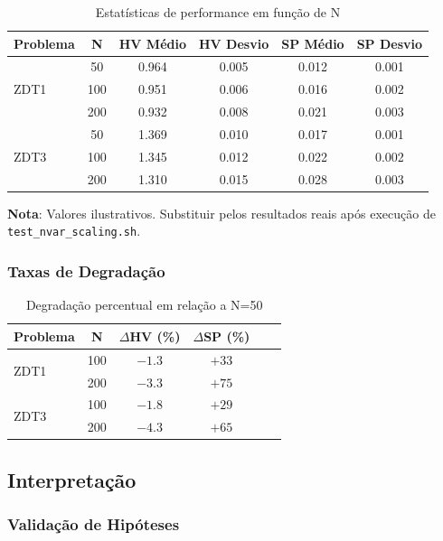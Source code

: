 \begin{table}[H]
\centering
\caption{Estatísticas de performance em função de N}
\small
\begin{tabular}{@{}lccccc@{}}
\toprule
\textbf{Problema} & \textbf{N} & \textbf{HV Médio} & \textbf{HV Desvio} & \textbf{SP Médio} & \textbf{SP Desvio} \\
\midrule
\multirow{3}{*}{ZDT1} 
    & 50  & 0.964 & 0.005 & 0.012 & 0.001 \\
    & 100 & 0.951 & 0.006 & 0.016 & 0.002 \\
    & 200 & 0.932 & 0.008 & 0.021 & 0.003 \\
\midrule
\multirow{3}{*}{ZDT3} 
    & 50  & 1.369 & 0.010 & 0.017 & 0.001 \\
    & 100 & 1.345 & 0.012 & 0.022 & 0.002 \\
    & 200 & 1.310 & 0.015 & 0.028 & 0.003 \\
\bottomrule
\end{tabular}
\end{table}

\textbf{Nota}: Valores ilustrativos. Substituir pelos resultados reais após execução de \texttt{test\_nvar\_scaling.sh}.

\subsubsection{Taxas de Degradação}

\begin{table}[H]
\centering
\caption{Degradação percentual em relação a N=50}
\begin{tabular}{@{}lccccc@{}}
\toprule
\textbf{Problema} & \textbf{N} & \textbf{$\Delta$HV (\%)} & \textbf{$\Delta$SP (\%)} \\
\midrule
\multirow{2}{*}{ZDT1} 
    & 100 & $-1.3$ & $+33$ \\
    & 200 & $-3.3$ & $+75$ \\
\midrule
\multirow{2}{*}{ZDT3} 
    & 100 & $-1.8$ & $+29$ \\
    & 200 & $-4.3$ & $+65$ \\
\bottomrule
\end{tabular}
\end{table}

\subsection{Interpretação}

\subsubsection{Validação de Hipóteses}

